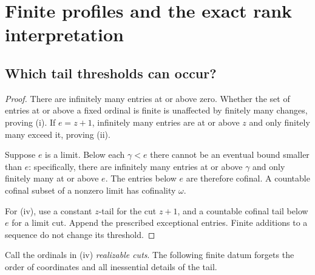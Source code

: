 \documentclass[11pt,a4paper]{article}
\newtheorem{lemma}[theorem]{Lemma}
\theoremstyle{definition}
\newcommand{\cf}{\operatorname{cf}}
\newcommand{\tail}{\varepsilon}
\begin{document}
\section{Finite profiles and the exact rank interpretation}\label{sec:profiles}

\subsection{Which tail thresholds can occur?}
\begin{proof}
There are infinitely many entries at or above zero. Whether the set of
entries at or above a fixed ordinal is finite is unaffected by finitely many
changes, proving (i). If $e=z+1$, infinitely many entries are at or above $z$
and only finitely many exceed it, proving (ii).

Suppose $e$ is a limit. Below each $\gamma<e$ there cannot be an eventual
bound smaller than $e$: specifically, there are infinitely many entries at
or above $\gamma$ and only finitely many at or above $e$. The entries below
$e$ are therefore cofinal. A countable cofinal subset of a nonzero limit
has cofinality $\omega$.

For (iv), use a constant $z$-tail for the cut $z+1$, and a countable cofinal
tail below $e$ for a limit cut. Append the prescribed exceptional entries.
Finite additions to a sequence do not change its threshold.
\end{proof}

Call the ordinals in (iv) \emph{realizable cuts}. The following finite datum
forgets the order of coordinates and all inessential details of the tail.
\end{document}
